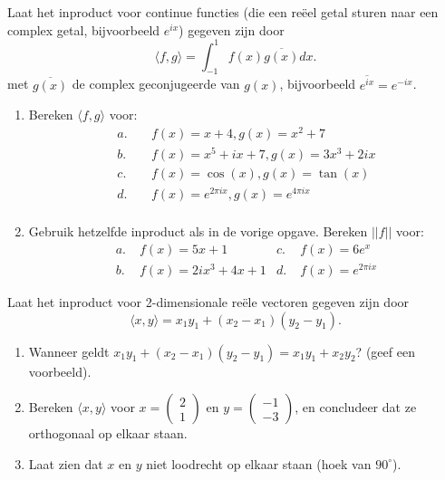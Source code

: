 \documentclass[../../main.tex]{subfiles}
\begin{document}
\medskip
\begin{opdracht}
Laat het inproduct voor continue functies (die een reëel getal sturen naar een complex getal, bijvoorbeeld $e^{ix}$) gegeven zijn door $$\langle f,g\rangle=\int_{-1}^1 f(x)\overline{g(x)}dx.$$ met $\overline{g(x)}$ de complex geconjugeerde van $g(x)$, bijvoorbeeld $\overline{e^{ix}}=e^{-ix}$.
\begin{enumerate}
    \item Bereken $\langle f,g\rangle$ voor:
    \begin{align*}
        a.&\;& f(x)=x+4,g(x)=x^2+7\\
        b.&\;& f(x)=x^5+ix+7,g(x)=3x^3+2ix\\
        c.&\;& f(x)=\cos(x),g(x)=\tan(x)\\
        d.&\;& f(x)=e^{2\pi ix},g(x)=e^{4\pi ix}\\
    \end{align*}
\item Gebruik hetzelfde inproduct als in de vorige opgave. Bereken $||f||$ voor:
    \begin{align*}
        a.\;& f(x)=5x+1
        & c.\;& f(x)=6e^x\\
        b.\;& f(x)=2ix^3+4x+1
        & d.\;& f(x)=e^{2\pi ix}
    \end{align*}
\end{enumerate}
\end{opdracht}
\begin{opdracht}
Laat het inproduct voor 2-dimensionale reële vectoren gegeven zijn door $$\langle x,y\rangle=x_1y_1+(x_2-x_1)(y_2-y_1).$$
\begin{enumerate}

\item Wanneer geldt $x_1y_1+(x_2-x_1)(y_2-y_1)=x_1y_1+x_2y_2$? (geef een voorbeeld).
\item Bereken $\langle x,y\rangle$ voor $x=\begin{pmatrix}2\\1\end{pmatrix}$ en $y=\begin{pmatrix}-1\\-3\end{pmatrix}$, en concludeer dat ze orthogonaal op elkaar staan.
\item Laat zien dat $x$ en $y$ niet loodrecht op elkaar staan (hoek van $90^\circ$).
\end{enumerate}
\end{opdracht}
\end{document}

